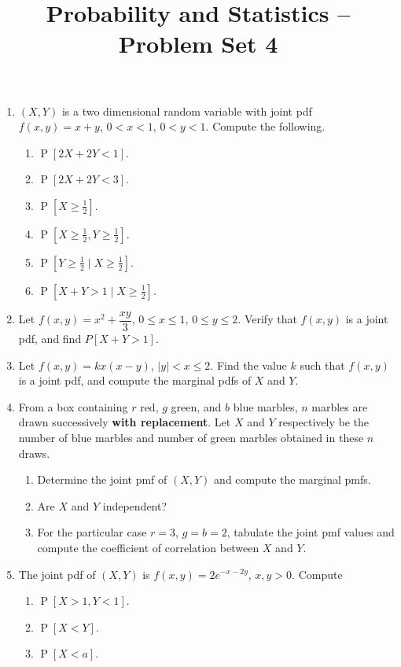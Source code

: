 \documentclass[svgnames]{amsart}
\title[]{Probability and Statistics -- Problem Set 4}
\DeclareMathOperator{\Prob}{P}
\begin{document}
\maketitle
\begin{enumerate}[leftmargin=*, itemsep=0.3em]
\item $(X, Y)$ is a two dimensional random variable with joint pdf $f(x, y) = x + y$, $0 < x < 1$, $0 < y < 1$. Compute the following.
\begin{enumerate}
	\item $\Prob[2X + 2Y < 1]$.
	\item $\Prob[2X + 2Y < 3]$.
	\item $\Prob[X \ge \frac 1 2]$.
	\item $\Prob[X \ge \frac 1 2, Y \ge \frac 1 2]$.
	\item $\Prob[Y \ge \frac 1 2 \mid X \ge \frac 1 2]$.
	\item $\Prob[X + Y > 1 \mid X \ge \frac 1 2]$.
\end{enumerate}

\item Let $f(x, y) = x^2 + \dfrac{xy}{3}$, $0 \le x \le 1$, $0 \le y \le 2$. Verify that $f(x, y)$ is a joint pdf, and find $P[X + Y > 1]$.

\item Let $f(x, y) = kx(x - y)$, $|y| < x \le 2$. Find the value $k$ such that $f(x, y)$ is a joint pdf, and compute the marginal pdfs of $X$ and $Y$.

\item From a box containing $r$ red, $g$ green, and $b$ blue marbles, $n$ marbles are drawn successively \textbf{with replacement}. Let $X$ and $Y$ respectively be the number of blue marbles and number of green marbles obtained in these $n$ draws.
\begin{enumerate}
	\item Determine the joint pmf of $(X, Y)$ and compute the marginal pmfs.
	\item Are $X$ and $Y$ independent?
	\item For the particular case $r = 3$, $g = b = 2$, tabulate the joint pmf values and compute the coefficient of correlation between $X$ and $Y$.
\end{enumerate}

\item The joint pdf of $(X, Y)$ is $f(x, y) = 2 e^{-x - 2y}$, $x, y > 0$. Compute
\begin{enumerate}
\item $\Prob[X > 1, Y < 1]$.
\item $\Prob[X < Y]$.
\item $\Prob[X < a]$.
\end{enumerate}


\end{enumerate}
\end{document}
